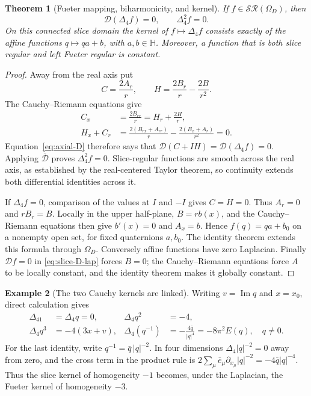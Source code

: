 \documentclass[11pt,a4paper]{article}
\numberwithin{equation}{section}
\newtheorem{theorem}{Theorem}[section]
\theoremstyle{definition}
\newtheorem{example}[theorem]{Example}
\theoremstyle{remark}
\newcommand{\HH}{\mathbb H}
\newcommand{\Ima}{\operatorname{Im}}
\newcommand{\SR}{\mathcal{SR}}
\newcommand{\cD}{\mathcal D}
\newcommand{\lap}{\Delta_4}
\begin{document}
\begin{theorem}[Fueter mapping, biharmonicity, and kernel]
\label{thm:fueter-map}
If $f\in\SR(\Omega_D)$, then
\begin{equation}\label{eq:fueter-map}
 \boxed{\cD(\lap f)=0,\qquad \lap^2 f=0.}
\end{equation}
On this connected slice domain the kernel of $f\mapsto\lap f$ consists
exactly of the affine functions $q\mapsto qa+b$, with $a,b\in\HH$.
Moreover, a function that is both slice regular and left Fueter regular
is constant.
\end{theorem}
\begin{proof}
Away from the real axis put
\[
 C=\frac{2A_r}{r},\qquad H=\frac{2B_r}{r}-\frac{2B}{r^2}.
\]
The Cauchy--Riemann equations give
\begin{align*}
 C_x&=\frac{2B_{rr}}r=H_r+\frac{2H}r,\\
 H_x+C_r
 &=\frac{2(B_{rx}+A_{rr})}{r}
     -\frac{2(B_x+A_r)}{r^2}=0.
\end{align*}
Equation~\eqref{eq:axial-D} therefore says that
$\cD(C+IH)=\cD(\lap f)=0$. Applying $\overline{\cD}$ proves
$\lap^2 f=0$. Slice-regular functions are smooth across the real axis, as
established by the real-centered Taylor theorem, so continuity extends
both differential identities across it.

If $\lap f=0$, comparison of the values at $I$ and $-I$ gives $C=H=0$.
Thus $A_r=0$ and $rB_r=B$. Locally in the upper half-plane,
$B=r b(x)$, and the Cauchy--Riemann equations then give $b'(x)=0$ and
$A_x=b$. Hence $f(q)=qa+b_0$ on a nonempty open set, for fixed
quaternions $a,b_0$. The identity theorem extends this formula through
$\Omega_D$. Conversely affine functions have zero Laplacian.
Finally $\cD f=0$ in \eqref{eq:slice-D-lap} forces $B=0$; the
Cauchy--Riemann equations force $A$ to be locally constant, and the identity
theorem makes it globally constant.
\end{proof}

\begin{example}[The two Cauchy kernels are linked]\label{ex:kernel-link}
Writing $v=\Ima q$ and $x=x_0$, direct calculation gives
\begin{align}
 \lap 1&=\lap q=0,&
 \lap q^2&=-4,\\
 \lap q^3&=-4(3x+v),&
 \lap(q^{-1})&=-\frac{4\bar q}{|q|^4}=-8\pi^2E(q),\quad q\ne0.
 \label{eq:kernel-link}
\end{align}
For the last identity, write $q^{-1}=\bar q\,|q|^{-2}$. In four dimensions
$\lap|q|^{-2}=0$ away from zero, and the cross term in the product rule is
$2\sum_\mu\bar e_\mu\partial_{x_\mu}|q|^{-2}
=-4\bar q|q|^{-4}$. Thus the slice kernel of homogeneity $-1$ becomes,
under the Laplacian, the Fueter kernel of homogeneity $-3$.
\end{example}
\end{document}
